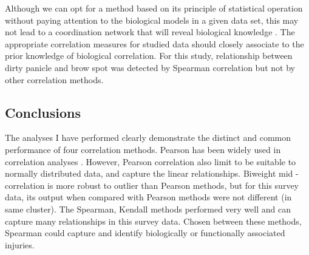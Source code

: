 Although we can opt for a method based on its principle of statistical operation without paying attention to the biological models in a given data set, this may not lead to a coordination network that will reveal biological knowledge \citep{Kumari_2012_Evaluation}. The appropriate correlation measures for studied data should closely associate to the prior knowledge of biological correlation. For this study, relationship between dirty panicle and brow spot was detected by Spearman correlation but not by other correlation methods.

\subsection{Conclusions}

The analyses I have performed clearly demonstrate the distinct and common performance of four correlation methods. Pearson has been widely used in correlation analyses \citep{Zhang_2005_General}. However, Pearson correlation also limit to be suitable to normally distributed data, and capture the linear relationships. Biweight mid -correlation is more robust to outlier than Pearson methods, but for this survey data, its output when compared with Pearson methods were not different (in same cluster). The Spearman, Kendall methods performed very well and can capture many relationships in this survey data. Chosen between these methods, Spearman could capture and identify biologically or functionally associated injuries.